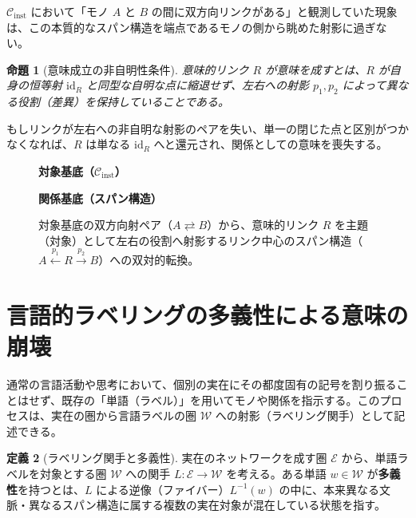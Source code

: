 \documentclass[11pt,a4paper,luatex]{jlreq}
\theoremstyle{definition}
\newtheorem{definition}{定義}[section]
\theoremstyle{plain}
\newtheorem{proposition}[definition]{命題}
\begin{document}
$\mathcal{C}_{\mathrm{inst}}$ において「モノ $A$ と $B$ の間に双方向リンクがある」と観測していた現象は、この本質的なスパン構造を端点であるモノの側から眺めた射影に過ぎない。

\begin{proposition}[意味成立の非自明性条件]
意味的リンク $R$ が意味を成すとは、$R$ が自身の恒等射 $\mathrm{id}_{R}$ と同型な自明な点に縮退せず、左右への射影 $p_1, p_2$ によって異なる役割（差異）を保持していることである。
\end{proposition}

もしリンクが左右への非自明な射影のペアを失い、単一の閉じた点と区別がつかなくなれば、$R$ は単なる $\mathrm{id}_{R}$ へと還元され、関係としての意味を喪失する。

\begin{figure}[htbp]
\centering
\begin{minipage}{0.42\textwidth}
\centering
\textbf{対象基底（$\mathcal{C}_{\mathrm{inst}}$）}\\[1.2em]
\end{minipage}
\hfill
\begin{minipage}{0.52\textwidth}
\centering
\textbf{関係基底（スパン構造）}\\[1.2em]
\end{minipage}
\caption{対象基底の双方向射ペア（$A \rightleftarrows B$）から、意味的リンク $R$ を主題（対象）として左右の役割へ射影するリンク中心のスパン構造（$A \xleftarrow{p_1} R \xrightarrow{p_2} B$）への双対的転換。}
\label{fig:span_shift}
\end{figure}

\section{言語的ラベリングの多義性による意味の崩壊}

通常の言語活動や思考において、個別の実在にその都度固有の記号を割り振ることはせず、既存の「単語（ラベル）」を用いてモノや関係を指示する。このプロセスは、実在の圏から言語ラベルの圏 $\mathcal{W}$ への射影（ラベリング関手）として記述できる。

\begin{definition}[ラベリング関手と多義性]
実在のネットワークを成す圏 $\mathcal{E}$ から、単語ラベルを対象とする圏 $\mathcal{W}$ への関手 $L: \mathcal{E} \to \mathcal{W}$ を考える。ある単語 $w \in \mathcal{W}$ が\textbf{多義性}を持つとは、$L$ による逆像（ファイバー）$L^{-1}(w)$ の中に、本来異なる文脈・異なるスパン構造に属する複数の実在対象が混在している状態を指す。
\end{definition}
\end{document}
